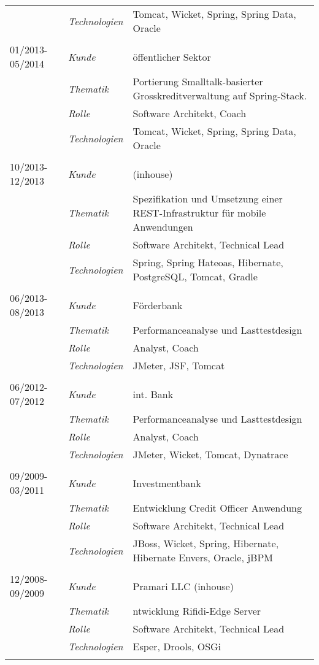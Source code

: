 \begin{longtable}{@{}>{}p{4cm}>{\itshape}p{2cm}>{}p{9cm}}
\nopagebreak        & Technologien  & Tomcat, Wicket, Spring, Spring Data, Oracle\\
\\
01/2013-05/2014     & Kunde         & öffentlicher Sektor\\
\nopagebreak        & Thematik      & Portierung Smalltalk-basierter Grosskreditverwaltung auf Spring-Stack. \\
\nopagebreak        & Rolle         & Software Architekt, Coach\\
\nopagebreak        & Technologien  & Tomcat, Wicket, Spring, Spring Data, Oracle\\
\\
10/2013-12/2013     & Kunde         & (inhouse)\\
\nopagebreak        & Thematik      & Spezifikation und Umsetzung einer REST-Infrastruktur für mobile Anwendungen\\
\nopagebreak        & Rolle         & Software Architekt, Technical Lead\\
\nopagebreak        & Technologien  & Spring, Spring Hateoas, Hibernate, PostgreSQL, Tomcat, Gradle\\
\\
06/2013-08/2013     & Kunde         & Förderbank\\
\nopagebreak        & Thematik      & Performanceanalyse und Lasttestdesign\\
\nopagebreak        & Rolle         & Analyst, Coach\\
\nopagebreak        & Technologien  & JMeter, JSF, Tomcat\\
\\
06/2012-07/2012     & Kunde         & int. Bank\\
\nopagebreak        & Thematik      & Performanceanalyse und Lasttestdesign\\
\nopagebreak        & Rolle         & Analyst, Coach\\
\nopagebreak        & Technologien  & JMeter, Wicket, Tomcat, Dynatrace\\
\\
09/2009-03/2011     & Kunde         & Investmentbank\\
\nopagebreak        & Thematik      & Entwicklung Credit Officer Anwendung\\
\nopagebreak        & Rolle         & Software Architekt, Technical Lead\\
\nopagebreak        & Technologien  & JBoss, Wicket, Spring, Hibernate, Hibernate Envers, Oracle, jBPM\\
\\
12/2008-09/2009     & Kunde         & Pramari LLC (inhouse)\\
\nopagebreak        & Thematik      & ntwicklung Rifidi-Edge Server\\
\nopagebreak        & Rolle         & Software Architekt, Technical Lead\\
\nopagebreak        & Technologien  & Esper, Drools, OSGi\\
\\
\end{longtable}
\renewcommand{\arraystretch}{2}
